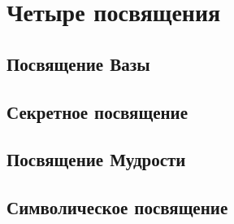 \section{Четыре посвящения}
\subsection{Посвящение Вазы}
\subsection{Секретное посвящение}
\subsection{Посвящение Мудрости}
\subsection{Символическое посвящение}


